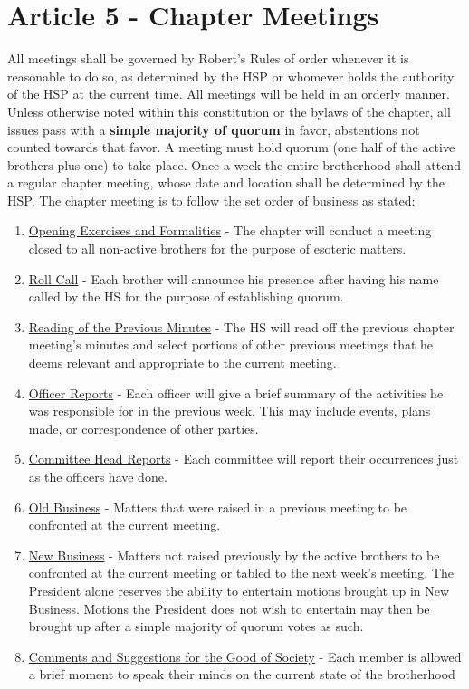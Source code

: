 \documentclass{article}
\begin{document}
\section*{Article 5 - Chapter Meetings}
\hspace*{1cm}All meetings shall be governed by Robert’s Rules of order whenever it is reasonable to do so, as determined by the HSP or whomever holds the authority of the HSP at the current time. All meetings will be held in an orderly manner. Unless otherwise noted within this constitution or the bylaws of the chapter, all issues pass with a \textbf{simple majority of quorum} in favor, abstentions not counted towards that favor. A meeting must hold quorum (one half of the active brothers plus one) to take place. Once a week the entire brotherhood shall attend a regular chapter meeting, whose date and location shall be determined by the HSP. The chapter meeting is to follow the set order of business as stated:
\begin{enumerate}
    \item \underline{Opening Exercises and Formalities} - The chapter will conduct a meeting closed to all non-active brothers for the purpose of esoteric matters.
    \item \underline{Roll Call} - Each brother will announce his presence after having his name called by the HS for the purpose of establishing quorum.
    \item \underline{Reading of the Previous Minutes} - The HS will read off the previous chapter meeting’s minutes and select portions of other previous meetings that he deems relevant and appropriate to the current meeting.
    \item \underline{Officer Reports} - Each officer will give a brief summary of the activities he was responsible for in the previous week. This may include events, plans made, or correspondence of other parties.
    \item \underline{Committee Head Reports} - Each committee will report their occurrences just as the officers have done.
    \item \underline{Old Business} - Matters that were raised in a previous meeting to be confronted at the current meeting.
    \item \underline{New Business} - Matters not raised previously by the active brothers to be confronted at the current meeting or tabled to the next week’s meeting. The President alone reserves the ability to entertain motions brought up in New Business. Motions the President does not wish to entertain may then be brought up after a simple majority of quorum votes as such.
    \item \underline{Comments and Suggestions for the Good of Society} - Each member is allowed a brief moment to speak their minds on the current state of the brotherhood
\end{enumerate}
\end{document}
